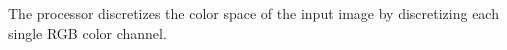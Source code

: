 The processor discretizes the color space of the input image by discretizing each single RGB color channel.